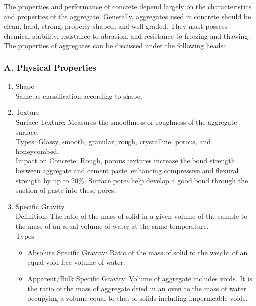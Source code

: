 \documentclass[a4paper,11pt]{book}
\begin{document}
The properties and performance of concrete depend largely on the characteristics and properties of the aggregate. Generally, aggregates used in concrete should be clean, hard, strong, properly shaped, and well-graded. They must possess chemical stability, resistance to abrasion, and resistance to freezing and thawing. The properties of aggregates can be discussed under the following heads:

\subsubsection{A. Physical Properties}
\begin{enumerate} 

\item Shape
\\Same as classification according to shape.

\item Texture
\\Surface Texture: Measures the smoothness or roughness of the aggregate surface.
\\Types: Glassy, smooth, granular, rough, crystalline, porous, and honeycombed.
\\Impact on Concrete: Rough, porous textures increase the bond strength between aggregate and cement paste, enhancing compressive and flexural strength by up to 20\%. Surface pores help develop a good bond through the suction of paste into these pores.

\item Specific Gravity
\\Definition: The ratio of the mass of solid in a given volume of the sample to the mass of an equal volume of water at the same temperature.
\\Types
\begin{itemize}
    
\item Absolute Specific Gravity: Ratio of the mass of solid to the weight of an equal void-free volume of water.
 \item Apparent/Bulk Specific Gravity: Volume of aggregate includes voids. It is the ratio of the mass of aggregate dried in an oven to the mass of water occupying a volume equal to that of solids including impermeable voids.

\end{itemize}
\end{enumerate}
\end{document}

